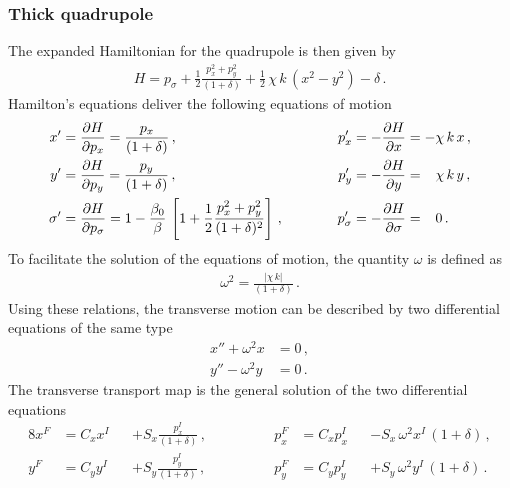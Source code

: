 \subsubsection{Thick quadrupole}
%
%
The expanded Hamiltonian for the quadrupole is then given by
\begin{align}
H = p_\sigma + \frac{1}{2} \frac{p_x^2+p_y^2}{(1+\delta)} + \frac{1}{2} \, \chi \, k  \, (x^2 -y^2) -\delta \, . \label{eq:quad_exp_H}
\end{align}
Hamilton's equations deliver the following equations of motion
%
\begin{alignat}{4}
x'      &= \frac{\partial H}{\partial p_x} = \frac{p_x}{(1+\delta)} \,,\quad \quad \quad &p_x' &= - \frac{\partial H}{\partial x} = - \chi\, k\, x \, ,  \\
y'      &= \frac{\partial H}{\partial p_y} = \frac{p_y}{(1+\delta)} \,,\quad \quad \quad &p_y' &= - \frac{\partial H}{\partial y} = \phantom{-} \chi\,  k \,  y \, , \\
\sigma' &= \frac{\partial H}{\partial p_\sigma} = 1- \frac{\beta_0}{\beta} \, \left[ 1 + \frac{1}{2} \frac{p_x^2 + p_y^2}{(1+\delta)^2}  \right] \,, \quad \quad \quad &p_\sigma' &= - \frac{\partial H}{\partial \sigma} =  \phantom{-}  0 \, .
\end{alignat}
To facilitate the solution of the equations of motion, the quantity $\omega$ is defined as
\begin{align}
 \omega^2 = \frac{|\chi \,  k|}{(1+\delta)} \, .
\end{align}
Using these relations, the transverse motion can be described by two differential equations of the same type
\begin{align}
x'' + \omega^2 x &= 0 \, , \label{eq:quadeq1} \\
y'' - \omega^2 y &= 0 \, .
\end{align}
%
The transverse transport map is the general solution of the two differential equations 
\begin{alignat}{8}
x^F &= C_x x^I &&+ S_x \frac{p_x^I}{(1+\delta)} \, ,\quad \quad \quad \quad &p_x^F &= C_x p_x^I &&-  S_x \, \omega^2 x^I \, (1+\delta) \, , \\ 
y^F &= C_y y^I &&+ S_y \frac{p_y^I}{(1+\delta)} \, , &p_y^F &= C_y p_y^I &&+  S_y \, \omega^2 y^I  \, (1+\delta) \, .  %
\end{alignat}
